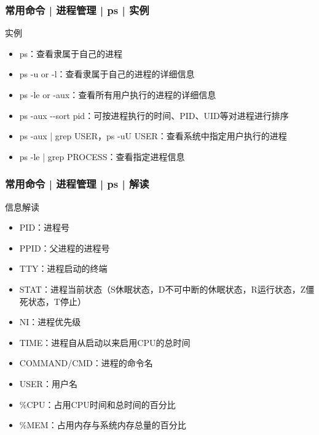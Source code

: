 \begin{frame}
  \frametitle{常用命令 | 进程管理 | ps | 实例}
  \begin{block}{实例}
    \begin{itemize}
      \item ps：查看隶属于自己的进程
      \item ps -u or -l：查看隶属于自己的进程的详细信息
      \item ps -le or -aux：查看所有用户执行的进程的详细信息
      \item ps -aux -\!-sort pid：可按进程执行的时间、PID、UID等对进程进行排序
      \item ps -aux | grep USER，ps -uU USER：查看系统中指定用户执行的进程
      \item ps -le | grep PROCESS：查看指定进程信息
    \end{itemize}
  \end{block}
\end{frame}

\begin{frame}
  \frametitle{常用命令 | 进程管理 | ps | 解读}
  \begin{block}{信息解读}
    \begin{itemize}
      \item PID：进程号
      \item PPID：父进程的进程号
      \item TTY：进程启动的终端
      \item STAT：进程当前状态（S休眠状态，D不可中断的休眠状态，R运行状态，Z僵死状态，T停止）
      \item NI：进程优先级
      \item TIME：进程自从启动以来启用CPU的总时间
      \item COMMAND/CMD：进程的命令名
      \item USER：用户名
      \item \%CPU：占用CPU时间和总时间的百分比
      \item \%MEM：占用内存与系统内存总量的百分比
    \end{itemize}
  \end{block}
\end{frame}

